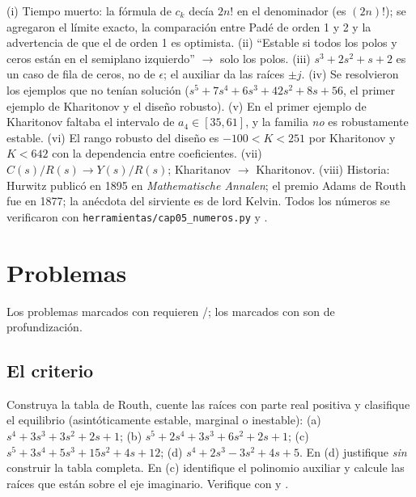 \begin{profundiza}
(i) Tiempo muerto: la fórmula de $c_k$ decía $2n!$ en el denominador (es $(2n)!$); se agregaron el límite exacto, la comparación entre Padé de orden 1 y 2 y la advertencia de que el de orden 1 es optimista. (ii) ``Estable si todos los polos y ceros están en el semiplano izquierdo'' $\to$ solo los polos. (iii) $s^3+2s^2+s+2$ es un caso de fila de ceros, no de $\epsilon$; el auxiliar da las raíces $\pm j$. (iv) Se resolvieron los ejemplos que no tenían solución ($s^5+7s^4+6s^3+42s^2+8s+56$, el primer ejemplo de Kharitonov y el diseño robusto). (v) En el primer ejemplo de Kharitonov faltaba el intervalo de $a_4\in[35,61]$, y la familia \emph{no} es robustamente estable. (vi) El rango robusto del diseño es $-100<K<251$ por Kharitonov y $K<642$ con la dependencia entre coeficientes. (vii) $C(s)/R(s)\to Y(s)/R(s)$; Kharitanov $\to$ Kharitonov. (viii) Historia: Hurwitz publicó en 1895 en \emph{Mathematische Annalen}; el premio Adams de Routh fue en 1877; la anécdota del sirviente es de lord Kelvin. Todos los números se verificaron con \texttt{herramientas/cap05\_numeros.py} y .
\end{profundiza}

\section{Problemas}
\label{sec:es-problemas}

Los problemas marcados con \etiquetaM{} requieren \matlab/\simulink; los marcados con \etiquetaEstrella{} son de profundización.

\subsection*{El criterio}

\begin{problema}[tablas]\label{prob:es-tablas}
Construya la tabla de Routh, cuente las raíces con parte real positiva y clasifique el equilibrio (asintóticamente estable, marginal o inestable): (a) $s^4+3s^3+3s^2+2s+1$; (b) $s^5+2s^4+3s^3+6s^2+2s+1$; (c) $s^5+3s^4+5s^3+15s^2+4s+12$; (d) $s^4+2s^3-3s^2+4s+5$. En (d) justifique \emph{sin} construir la tabla completa. En (c) identifique el polinomio auxiliar y calcule las raíces que están sobre el eje imaginario. \etiquetaM{} Verifique con  y .
\end{problema}

